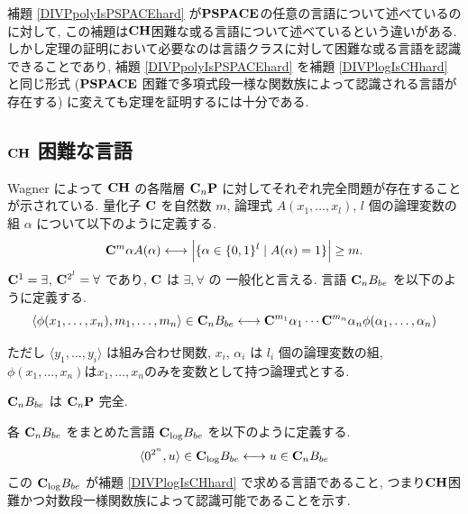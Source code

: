 補題 \ref{DIVPpolyIsPSPACEhard} が$\mathbf{PSPACE}$の任意の言語について述べているのに対して,
この補題は$\mathbf{CH}$困難な或る言語について述べているという違いがある.
しかし定理の証明において必要なのは言語クラスに対して困難な或る言語を認識できることであり,
補題 \ref{DIVPpolyIsPSPACEhard} を補題 \ref{DIVPlogIsCHhard} と同じ形式
($\mathbf{PSPACE}$ 困難で多項式段一様な関数族によって認識される言語が存在する)
に変えても定理を証明するには十分である.



\subsection{$\mathbf{CH}$ 困難な言語}

Wagner によって $\mathbf{CH}$ の各階層 $\mathbf{C}_n \mathbf{P}$ に対してそれぞれ完全問題が存在することが示されている\cite{wagner1986complexity}.
量化子 $\mathbf{C}$ を自然数 $m$, 論理式 $A(x_1, \dots, x_l)$, 
$l$ 個の論理変数の組 $\alpha$ について以下のように定義する.
\begin{equation}
 \mathbf{C}^m \alpha A(\alpha) 
  \longleftrightarrow 
  \Bigl|\{\alpha \in \{0,1\}^l \mid A(\alpha) = 1\}\Bigr| \ge m.
\end{equation}
$\mathbf{C}^1 = \exists$, $\mathbf{C}^{2^l} = \forall$ であり, $\mathbf{C}$ は $\exists, \forall$ の
一般化と言える.
言語 $\mathbf{C}_n B_{be}$ を以下のように定義する.
\begin{equation}
 \langle \phi(x_1, \dots, x_n), m_1, \dots, m_n \rangle \in \mathbf{C}_n B_{be}
 \longleftrightarrow
 \mathbf{C}^{m_1}{\alpha_1} \cdots \mathbf{C}^{m_n}{\alpha_n} \phi(\alpha_1, \dots, \alpha_n) 
\end{equation}

ただし $\langle y_1, \dots, y_i \rangle$ は組み合わせ関数,
$x_i$, $\alpha_i$ は $l_i$ 個の論理変数の組,
$\phi(x_1, \dots, x_n)$は$x_1, \dots, x_n$のみを変数として持つ論理式とする.


\begin{lemma} \label{lemma:CnP-complete}
 $\mathbf{C}_n B_{be}$ は $\mathbf{C}_n\mathbf{P}$ 完全.
\end{lemma}


各 $\mathbf{C}_n B_{be}$ をまとめた言語 $\mathbf{C}_{\log} B_{be}$ を以下のように定義する.
\begin{equation}
 \langle 0^{2^n}, u \rangle \in \mathbf{C}_{\log} B_{be}
 \longleftrightarrow
 u \in \mathbf{C}_n B_{be}
\end{equation}
この $\mathbf{C}_{\log} B_{be}$ が補題 \ref{DIVPlogIsCHhard} で求める言語であること,
つまり$\mathbf{CH}$困難かつ対数段一様関数族によって認識可能であることを示す.


